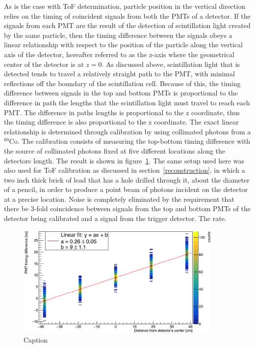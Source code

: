 As is the case with ToF determination, particle position in the vertical direction relies on the timing of coincident signals from both the PMTs of a detector. If the signals from each PMT are the result of the detection of scintillation light created by the same particle, then the timing difference between the signals obeys a linear relationship with respect to the position of the particle along the vertical axis of the detector, hereafter referred to as the z-axis where the geometrical center of the detector is at $z=0$. As discussed above, scintillation light that is detected tends to travel a relatively straight path to the PMT, with minimal reflections off the boundary of the scintillation cell. Because of this, the timing difference between signals in the top and bottom PMTs is proportional to the difference in path the lengths that the scintillation light must travel to reach each PMT. The difference in paths lengths is proportional to the z coordinate, thus the timing difference is also proportional to the z coordinate. The exact linear relationship is determined through calibration by using collimated photons from a $^{60}$Co. The calibration consists of measuring the top-bottom timing difference with the source of collimated photons fixed at five different locations along the detectors length. The result is shown in figure~\ref{fig:PMTDifference}. The same setup used here was also used for ToF calibration as discussed in section~\ref{reconstruction}, in which a two inch thick brick of lead that has a hole drilled through it, about the diameter of a pencil, in order to produce a point beam of photons incident on the detector at a precise location. Noise is completely eliminated by the requirement that there be 3-fold coincidence between signals from the top and bottom PMTs of the detector being calibrated and a signal from the trigger detector. The rate. 
\begin{figure}
    \centering
    \includegraphics[width = 0.9\textwidth]{Content/Methods/PMTDifference.png}
    \caption{Caption}
    \label{fig:PMTDifference}
\end{figure}
